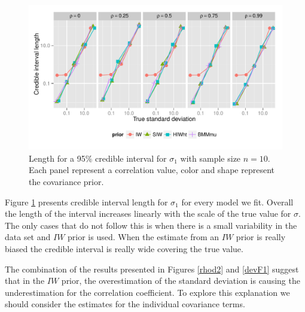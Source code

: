 \documentclass[a4paper]{article}
\begin{document}
\begin{figure}[htbp]
   \centering
   \includegraphics[width=\textwidth]{cilength_s1}
    \vspace{-.5in}
   \caption{Length for a 95\% credible interval for $\sigma_1$ with sample size $n=10$. Each panel represent a correlation value,  color and shape represent the covariance prior. \label{devF3} }
\end{figure}
Figure \ref{devF3} presents credible interval length for $\sigma_1$ for every model we fit. Overall the length of the interval increases linearly with the scale of the true value for $\sigma$. The only cases that do not follow this is when there is a small variability in the data set and $IW$ prior is used. When the estimate from an $IW$ prior is really biased the credible interval is really wide covering the true value. 

The combination of the results presented in Figures \ref{rhod2} and \ref{devF1}  suggest that in the $IW$ prior, the overestimation of the standard deviation is causing the underestimation for the correlation coefficient. To explore this explanation we should consider the estimates for the individual covariance terms. 
\end{document}
